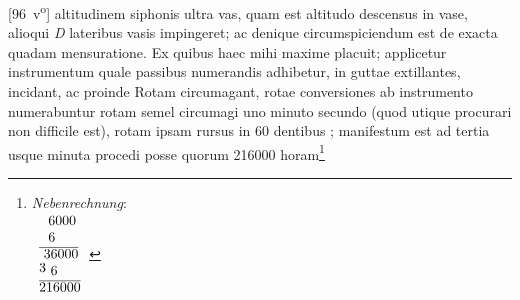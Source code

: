 [96~v\textsuperscript{o}] altitudinem siphonis\protect{} ultra vas,  quam est altitudo descensus in vase, alioqui \textit{D} lateribus  vasis impingeret; ac denique circumspiciendum est de exacta quadam  mensuratione. Ex quibus haec mihi maxime placuit; applicetur instrumentum quale passibus numerandis adhibetur, in  guttae extillantes, incidant, ac proinde Rotam\protect{} circumagant, rotae\protect{} conversiones ab instrumento numerabuntur rotam\protect{} semel circumagi uno minuto secundo (quod  utique procurari non difficile est),  rotam\protect{} ipsam  rursus in 60 dentibus\protect{} ; manifestum est ad tertia usque minuta procedi posse quorum 216000 horam\footnote{\textit{Nebenrechnung}:\\
$\protect\begin{array}{l} ~~6000\\~~6\\\overline{~36000}\\\protect\raisebox{0.5ex}{3}~6~~~\\\overline{216000}\protect\end{array}$
}
